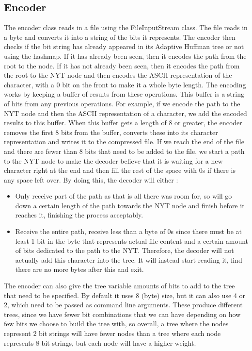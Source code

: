 \documentclass[12pt, letterpaper]{article}
\begin{document}
\subsection{Encoder}
The encoder class reads in a file using the FileInputStream class. The file reads in a byte and converts it into a string of the bits it represents. The encoder then checks if the bit string has already appeared in its Adaptive Huffman tree or not using the hashmap. If it has already been seen, then it encodes the path from the root to the node. If it has not already been seen, then it encodes the path from the root to the NYT node and then encodes the ASCII representation of the character, with a 0 bit on the front to make it a whole byte length.
\newline \newline
The encoding works by keeping a buffer of results from these operations. This buffer is a string of bits from any previous operations. For example, if we encode the path to the NYT node and then the ASCII representation of a character, we add the encoded results to this buffer. When this buffer gets a length of 8 or greater, the encoder removes the first 8 bits from the buffer, converts these into its character representation and writes it to the compressed file.
\newline \newline
If we reach the end of the file and there are fewer than 8 bits that need to be added to the file, we start a path to the NYT node to make the decoder believe that it is waiting for a new character right at the end and then fill the rest of the space with 0s if there is any space left over. By doing this, the decoder will either :
\begin{itemize}
\item Only receive part of the path as that is all there was room for, so will go down a certain length of the path towards the NYT node and finish before it reaches it, finishing the process acceptably.
\item Receive the entire path, receive less than a byte of 0s since there must be at least 1 bit in the byte that represents actual file content and a certain amount of bits dedicated to the path to the NYT. Therefore, the decoder will not actually add this character into the tree. It will instead start reading it, find there are no more bytes after this and exit.
\end{itemize}
The encoder can also give the tree variable amounts of bits to add to the tree that need to be specified. By default it uses 8 (byte) size, but it can also use 4 or 2, which need to be passed as command line arguments. These produce different trees, since we have fewer bit combinations that we can have depending on how few bits we choose to build the tree with, so overall, a tree where the nodes represent 2 bit strings will have fewer nodes than a tree where each node represents 8 bit strings, but each node will have a higher weight.
\end{document}
